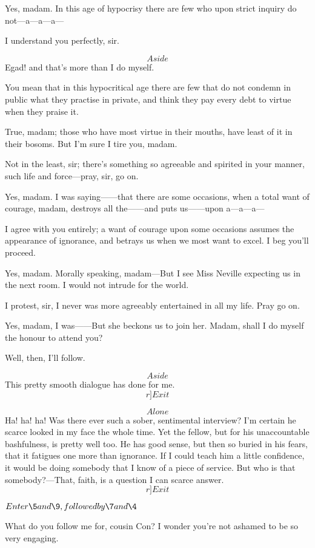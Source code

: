 \documentclass{book}
\begin{document}
\2  Yes, madam.  In this age of hypocrisy there are few who upon
strict inquiry do not---a---a---a---

\8  I understand you perfectly, sir.

\2  \[Aside\]  Egad! and that's more than I do myself.

\8  You mean that in this hypocritical age there are few
that do not condemn in public what they practise in private, and think
they pay every debt to virtue when they praise it.

\2  True, madam; those who have most virtue in their mouths, have
least of it in their bosoms.  But I'm sure I tire you, madam.

\8  Not in the least, sir; there's something so
agreeable and spirited in your manner, such life and force---pray, sir,
go on.

\2  Yes, madam.  I was saying------that there are some occasions,
when a total want of courage, madam, destroys all the------and puts
us------upon a---a---a---

\8  I agree with you entirely; a want of courage upon
some occasions assumes the appearance of ignorance, and betrays us when
we most want to excel.  I beg you'll proceed.

\2  Yes, madam.  Morally speaking, madam---But I see Miss Neville
expecting us in the next room.  I would not intrude for the world.

\8  I protest, sir, I never was more agreeably
entertained in all my life.  Pray go on.

\2  Yes, madam, I was------But she beckons us to join her.  Madam,
shall I do myself the honour to attend you?

\8  Well, then, I'll follow.

\2  \[Aside\]  This pretty smooth dialogue has done for me. 
\[r]Exit\]

\8  \[Alone\]  Ha! ha! ha!  Was there ever such a sober,
sentimental interview?  I'm certain he scarce looked in my face the
whole time.  Yet the fellow, but for his unaccountable bashfulness, is
pretty well too.  He has good sense, but then so buried in his fears,
that it fatigues one more than ignorance.  If I could teach him a
little confidence, it would be doing somebody that I know of a piece of
service.  But who is that somebody?---That, faith, is a question I can
scarce answer.  \[r]Exit\]


\(Enter \5 and \9, followed by \7 and \4\)


\5  What do you follow me for, cousin Con?  I wonder you're not
ashamed to be so very engaging.
\end{document}
